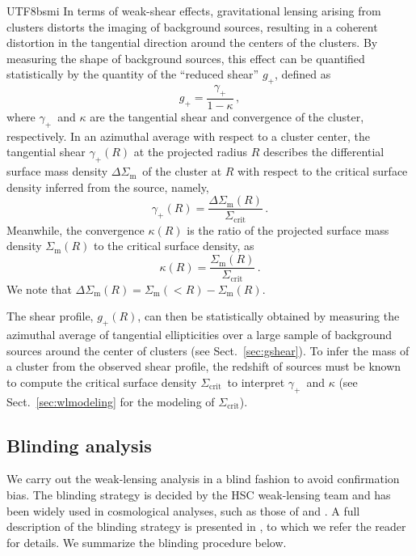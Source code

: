 \documentclass[longauth]{aa}
\newcommand{\rshear}{\ensuremath{\gamma_{+}}}
\newcommand{\gshear}{\ensuremath{g_{+}}}
\newcommand{\deltaSigma}{\ensuremath{\Delta{\Sigma}_{\mathrm{m}}}}
\newcommand{\Sigmam}{\ensuremath{{\Sigma}_{\mathrm{m}}}}
\newcommand{\sigmacrit}{\ensuremath{\Sigma_{\mathrm{crit}}}}
\begin{document}
\begin{CJK*}{UTF8}{bsmi}
In terms of weak-shear effects, gravitational lensing arising from clusters distorts the imaging of background sources, resulting in a coherent distortion in the tangential direction around the centers of the clusters.
By measuring the shape of background sources, this effect can be quantified statistically by the  quantity of the ``reduced shear'' \gshear, defined as
%
\begin{equation}
\label{eq:reducedshear_def}
\gshear = \frac{\rshear}{1 - \kappa} \, ,
\end{equation}
% 
where \rshear\ and $\kappa$ are the tangential shear and convergence of the cluster, respectively.
In an azimuthal average with respect to a cluster center, 
the tangential shear $\rshear\left(R\right)$ at the projected radius $R$ describes the differential surface mass density \deltaSigma\ of the cluster at $R$ with respect to the critical surface density inferred from the source, namely,
%
\begin{equation}
\label{eq:rshear_def}
\rshear\left(R\right) = \frac{
\deltaSigma\left(R\right)
}{
\sigmacrit
} \, .
\end{equation}
%
Meanwhile, the convergence $\kappa\left(R\right)$ is the ratio of the projected surface mass density $\Sigmam\left(R\right)$ to the critical surface density, as
%
\begin{equation}
\label{eq:kappa_def}
\kappa\left(R\right) = \frac{
\Sigmam\left(R\right)
}{
\sigmacrit
} \, .
\end{equation}
%
We note that $\deltaSigma\left(R\right) = \Sigmam\left(<R\right) - \Sigmam\left(R\right)$.

The shear profile, $\gshear\left(R\right)$, can then be statistically obtained by measuring the azimuthal average of tangential ellipticities over a large sample of background sources around the center of clusters (see Sect.~\ref{sec:gshear}). 
To infer the mass of a cluster from the observed shear profile, the redshift of sources must be known to compute the critical surface density \sigmacrit\ to interpret \rshear\ and $\kappa$ (see Sect.~\ref{sec:wlmodeling} for the modeling of \sigmacrit).
 
\subsection{Blinding analysis}
\label{sec:blinding}

We carry out the weak-lensing analysis in a blind fashion to avoid confirmation bias.
The blinding strategy is decided by the HSC weak-lensing team and has been widely used in cosmological analyses, such as those of \cite{hikage19} and \cite{hamana20}.
A full description of the blinding strategy is presented in \cite{hikage19}, to which we refer the reader for details. We summarize the blinding procedure below.


\end{CJK*}
\end{document}
